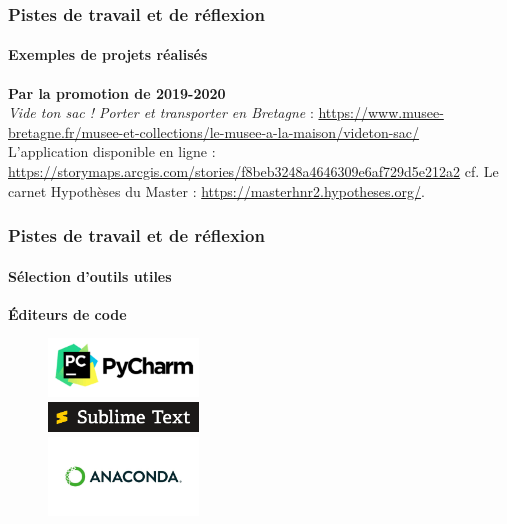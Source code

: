 \documentclass[xcolor=table]{beamer}
\begin{document}
\begin{frame}[plain]
\frametitle{Pistes de travail et de r\'eflexion}
\framesubtitle{Exemples de projets r\'ealis\'es}
\textbf{Par la promotion de 2019-2020}\\
\newline
\og \textit{Vide ton sac ! Porter et transporter en Bretagne}\fg{} : \url{https://www.musee-bretagne.fr/musee-et-collections/le-musee-a-la-maison/videton-sac/} \\
L'application disponible en ligne : \url{https://storymaps.arcgis.com/stories/f8beb3248a4646309e6af729d5e212a2}
\newline
\newline
cf. Le carnet Hypoth\`eses du Master : \url{https://masterhnr2.hypotheses.org/}. 
\end{frame}

\begin{frame}[plain]
\frametitle{Pistes de travail et de r\'eflexion}
\framesubtitle{S\'election d'outils utiles}
\textbf{\'Editeurs de code}
\begin{figure}[!]
\includegraphics[width=4cm]{images/pyCharm-logo.png} \\
\includegraphics[width=4cm]{images/sublime_text_logo.png}\\
\includegraphics[width=4cm]{images/anaconda-logo.png}
\end{figure}
\end{frame}
\end{document}
